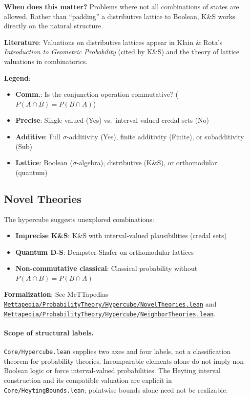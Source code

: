 \documentclass[11pt]{article}
\theoremstyle{definition}
\theoremstyle{remark}
\begin{document}
\textbf{When does this matter?} Problems where not all combinations of states are allowed.
Rather than ``padding'' a distributive lattice to Boolean, K\&S works directly on the natural structure.

\textbf{Literature}: Valuations on distributive lattices appear in Klain \& Rota's \emph{Introduction to Geometric Probability} (cited by K\&S) and the theory of lattice valuations in combinatorics.

\textbf{Legend}:
\begin{itemize}
\item \textbf{Comm.}: Is the conjunction operation commutative? ($P(A \cap B) = P(B \cap A)$)
\item \textbf{Precise}: Single-valued (Yes) vs.\ interval-valued credal sets (No)
\item \textbf{Additive}: Full $\sigma$-additivity (Yes), finite additivity (Finite), or subadditivity (Sub)
\item \textbf{Lattice}: Boolean ($\sigma$-algebra), distributive (K\&S), or orthomodular (quantum)
\end{itemize}

\subsection{Novel Theories}

The hypercube suggests unexplored combinations:
\begin{itemize}
\item \textbf{Imprecise K\&S}: K\&S with interval-valued plausibilities (credal sets)
\item \textbf{Quantum D-S}: Dempster-Shafer on orthomodular lattices
\item \textbf{Non-commutative classical}: Classical probability without $P(A \cap B) = P(B \cap A)$
\end{itemize}

\textbf{Formalization}: See MeTTapedia\textquotesingle s
\href{https://github.com/zariuq/MeTTapedia/blob/main/lean/mettapedia/Mettapedia/ProbabilityTheory/Hypercube/NovelTheories.lean}{\texttt{Mettapedia/ProbabilityTheory/Hypercube/NovelTheories.lean}} and \\
\hspace*{2em} \href{https://github.com/zariuq/MeTTapedia/blob/main/lean/mettapedia/Mettapedia/ProbabilityTheory/Hypercube/NeighborTheories.lean}{\texttt{Mettapedia/ProbabilityTheory/Hypercube/NeighborTheories.lean}}.

\paragraph{Scope of structural labels.}
\texttt{Core/Hypercube.lean} supplies two axes and four labels, not a
classification theorem for probability theories. Incomparable elements alone
do not imply non-Boolean logic or force interval-valued probabilities. The
Heyting interval construction and its compatible valuation are explicit in
\texttt{Core/HeytingBounds.lean}; pointwise bounds alone need not be realizable.
\end{document}
